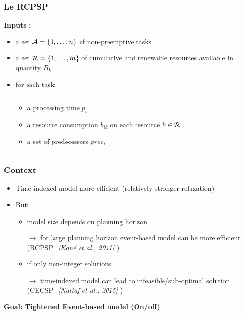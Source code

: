 
\begin{frame}
  \frametitle{Le RCPSP}
 \vspace{0.4cm}
 \textbf{Inputs : }
 \vspace{0.4cm}
  \begin{itemize}
  \item a set ${\cal A}=\{1,\dots ,n\}$ of non-preemptive tasks
    \vspace{0.4cm}
  \item a set ${\cal R}=\{1,\dots ,m\}$ of cumulative and renewable resources available in quantity $B_k$
      \vspace{0.4cm}
  \item<2-> for each task:
    \begin{columns}
      \hfill
      \begin{column}{0.5\linewidth}
        \begin{itemize}
          \vspace{-0.6cm}
        \item<2-> \footnotesize  a processing time $p_i$
          \vspace{0.25cm}
        \item<3-> \footnotesize a resource consumption $b_{ik}$ on each
          resource $k \in {\cal R}$ 
          \vspace{0.25cm}
        \item<4-> \footnotesize a set of predecessors $prec_i $
          \vspace{0.25cm}
        \end{itemize}
      \end{column}
      \hfill
      \begin{column}{0.4\linewidth}
        \centering
          
      \end{column} 
      \hfill
    \end{columns}
  \end{itemize} 
\end{frame}


\begin{frame}
  \frametitle{Context}
  \begin{itemize}
  \item Time-indexed model more efficient {\small (relatively stronger relaxation)}
\pause
    \vfill
  \item But:
    \begin{itemize}
    \item  model size depends on planning horizon 
      
      $\longrightarrow $ for large planning horizon event-based model can be more
      efficient (RCPSP:~{\color{gray!50!black!70}\it [Koné et al.,
        2011]} )
      \vfill
\pause
    \item  if only non-integer solutions
      
      $\longrightarrow$ time-indexed model can lead to
      infeasible/sub-optimal solution
      (CECSP:~{\color{gray!50!black!70}\it [Nattaf et al., 2015]} )
    \end{itemize}
  \end{itemize}
\vfill
\pause
{\bf Goal: Tightened Event-based model (On/off)} 
\end{frame}

